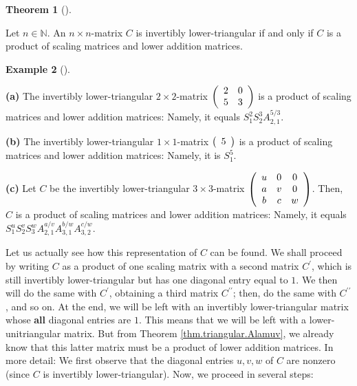 \documentclass[numbers=enddot,12pt,final,onecolumn,notitlepage]{scrartcl}%
\theoremstyle{definition}
\newtheorem{theo}{Theorem}[section]
\newenvironment{theorem}[1][]
{\begin{theo}[#1]\begin{leftbar}}
{\end{leftbar}\end{theo}}
\newtheorem{exam}[theo]{Example}
\newenvironment{example}[1][]
{\begin{exam}[#1]\begin{leftbar}}
{\end{leftbar}\end{exam}}
\begin{document}
\begin{theorem}
\label{thm.triangular.Slamu}Let $n\in\mathbb{N}$. An $n\times n$-matrix $C$ is
invertibly lower-triangular if and only if $C$ is a product of scaling
matrices and lower addition matrices.
\end{theorem}

\begin{example}
\label{exam.thm.triangular.Slamu}\textbf{(a)} The invertibly lower-triangular
$2\times2$-matrix $\left(
\begin{array}
[c]{cc}%
2 & 0\\
5 & 3
\end{array}
\right)  $ is a product of scaling matrices and lower addition matrices:
Namely, it equals $S_{1}^{2}S_{2}^{3}A_{2,1}^{5/3}$.

\textbf{(b)} The invertibly lower-triangular $1\times1$-matrix $\left(
\begin{array}
[c]{c}%
5
\end{array}
\right)  $ is a product of scaling matrices and lower addition matrices:
Namely, it is $S_{1}^{5}$.

\textbf{(c)} Let $C$ be the invertibly lower-triangular $3\times3$-matrix
$\left(
\begin{array}
[c]{ccc}%
u & 0 & 0\\
a & v & 0\\
b & c & w
\end{array}
\right)  $. Then, $C$ is a product of scaling matrices and lower addition
matrices: Namely, it equals $S_{1}^{u}S_{2}^{v}S_{3}^{w}A_{2,1}^{a/v}%
A_{3,1}^{b/w}A_{3,2}^{c/w}$.

Let us actually see how this representation of $C$ can be found. We shall
proceed by writing $C$ as a product of one scaling matrix with a second matrix
$C^{\prime}$, which is still invertibly lower-triangular but has one diagonal
entry equal to $1$. We then will do the same with $C^{\prime}$, obtaining a
third matrix $C^{\prime\prime}$; then, do the same with $C^{\prime\prime}$,
and so on. At the end, we will be left with an invertibly lower-triangular
matrix whose \textbf{all} diagonal entries are $1$. This means that we will be
left with a lower-unitriangular matrix. But from Theorem
\ref{thm.triangular.Alamuv}, we already know that this latter matrix must be a
product of lower addition matrices. In more detail: We first observe that the
diagonal entries $u,v,w$ of $C$ are nonzero (since $C$ is invertibly
lower-triangular). Now, we proceed in several steps:


\end{example}
\end{document}
